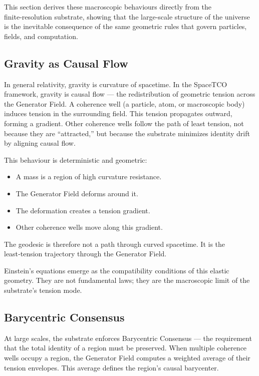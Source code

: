 \documentclass[reprint,amsmath,amssymb,aps,prl,floatfix]{revtex4-2}
\begin{document}
\begin{itemize}
This section derives these macroscopic behaviours directly from the finite‑resolution substrate, showing that the large‑scale structure of the universe is the inevitable consequence of the same geometric rules that govern particles, fields, and computation.

\subsection{Gravity as Causal Flow}

In general relativity, gravity is curvature of spacetime. In the SpaceTCO framework, gravity is causal flow — the redistribution of geometric tension across the Generator Field. A coherence well (a particle, atom, or macroscopic body) induces tension in the surrounding field. This tension propagates outward, forming a gradient. Other coherence wells follow the path of least tension, not because they are “attracted,” but because the substrate minimizes identity drift by aligning causal flow.
\medskip

This behaviour is deterministic and geometric:
\begin{itemize}
\item A mass is a region of high curvature resistance.  
\item The Generator Field deforms around it.  
\item The deformation creates a tension gradient.  
\item Other coherence wells move along this gradient.  
\end{itemize}
\medskip

The geodesic is therefore not a path through curved spacetime.  
It is the least‑tension trajectory through the Generator Field.
\medskip

Einstein’s equations emerge as the compatibility conditions of this elastic geometry. They are not fundamental laws; they are the macroscopic limit of the substrate’s tension mode.

\subsection{Barycentric Consensus}

At large scales, the substrate enforces Barycentric Consensus — the requirement that the total identity of a region must be preserved. When multiple coherence wells occupy a region, the Generator Field computes a weighted average of their tension envelopes. This average defines the region’s causal barycenter.
\medskip


\end{itemize}
\end{document}
